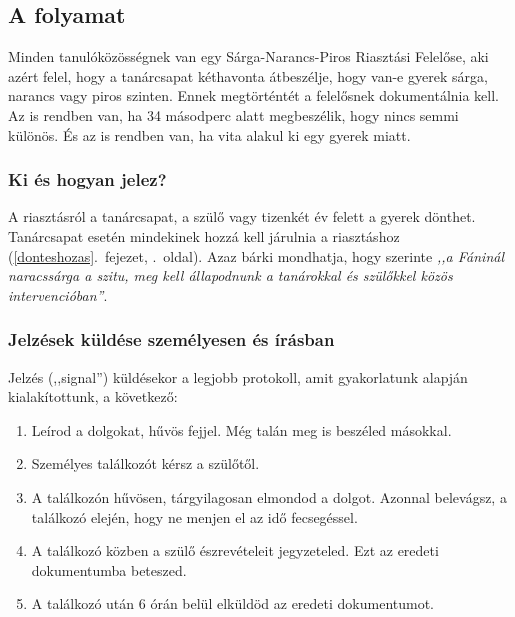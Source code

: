 \hypertarget{folyamat}{%
\subsection{A folyamat}\label{folyamat}}

Minden tanulóközösségnek van egy Sárga-Narancs-Piros Riasztási Felelőse,
aki azért felel, hogy a tanárcsapat kéthavonta átbeszélje, hogy van-e
gyerek sárga, narancs vagy piros szinten. Ennek megtörténtét a felelősnek
dokumentálnia kell. Az is rendben van, ha 34 másodperc alatt megbeszélik, hogy
nincs semmi különös. És az is rendben van, ha vita alakul ki egy gyerek
miatt.

\hypertarget{ki-es-hogyan-jelez}{%
\subsubsection{Ki és hogyan jelez?}\label{ki-es-hogyan-jelez}}

A riasztásról a tanárcsapat, a szülő vagy tizenkét év felett a gyerek
dönthet. Tanárcsapat esetén
mindekinek hozzá kell járulnia a riasztáshoz (\ref{donteshozas}.~fejezet, .~oldal). Azaz bárki mondhatja, hogy szerinte \emph{,,a Fáninál
naracssárga a szitu, meg kell állapodnunk a tanárokkal és szülőkkel
közös intervencióban''}.

\hypertarget{jelzesek-kuldese---szemelyes-es-irasban}{%
\subsubsection{Jelzések küldése személyesen és
írásban}\label{jelzesek-kuldese---szemelyes-es-irasban}}

Jelzés (,,signal'') küldésekor a legjobb protokoll, amit gyakorlatunk alapján
kialakítottunk, a következő:

\begin{enumerate}
\def\labelenumi{\arabic{enumi}.}
\tightlist
\item
  Leírod a dolgokat, hűvös fejjel. Még talán meg is beszéled másokkal.
\item
  Személyes találkozót kérsz a szülőtől.
\item
  A találkozón hűvösen, tárgyilagosan elmondod a dolgot. Azonnal belevágsz, a
  találkozó elején, hogy ne menjen el az idő fecsegéssel.
\item
  A találkozó közben a szülő észrevételeit jegyzeteled. Ezt az eredeti
  dokumentumba beteszed.
\item
  A találkozó után 6 órán belül elküldöd az eredeti dokumentumot.
\end{enumerate}


